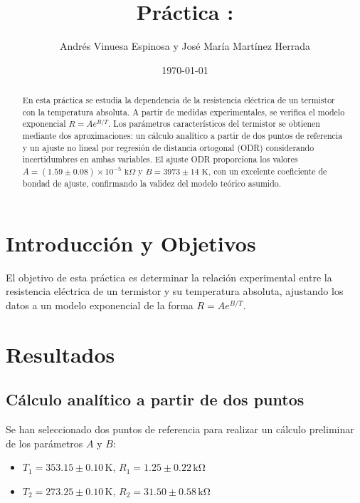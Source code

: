 \documentclass[11pt,a4paper]{article}
\title{Práctica \numeroPractica: \tituloPractica}
\author{Andrés Vinuesa Espinosa y José María Martínez Herrada}
\date{\today}
\begin{document}
\maketitle

\begin{abstract}
En esta práctica se estudia la dependencia de la resistencia eléctrica de un termistor con la temperatura absoluta. A partir de medidas experimentales, se verifica el modelo exponencial $R = A e^{B/T}$. Los parámetros característicos del termistor se obtienen mediante dos aproximaciones: un cálculo analítico a partir de dos puntos de referencia y un ajuste no lineal por regresión de distancia ortogonal (ODR) considerando incertidumbres en ambas variables. El ajuste ODR proporciona los valores $A = (1.59 \pm 0.08) \times 10^{-5} \text{ k}\Omega$ y $B = 3973 \pm 14 \text{ K}$, con un excelente coeficiente de bondad de ajuste, confirmando la validez del modelo teórico asumido.
\end{abstract}

\section{Introducción y Objetivos}
El objetivo de esta práctica es determinar la relación experimental entre la resistencia eléctrica de un termistor y su temperatura absoluta, ajustando los datos a un modelo exponencial de la forma $R = A e^{B/T}$.

\section{Resultados}

\subsection{Cálculo analítico a partir de dos puntos}
Se han seleccionado dos puntos de referencia para realizar un cálculo preliminar de los parámetros $A$ y $B$:
\begin{itemize}
    \item $T_1 = 353.15 \pm 0.10\,\mathrm{K}$, $R_1 = 1.25 \pm 0.22\,\mathrm{k\Omega}$
    \item $T_2 = 273.25 \pm 0.10\,\mathrm{K}$, $R_2 = 31.50 \pm 0.58\,\mathrm{k\Omega}$
\end{itemize}
\end{document}
